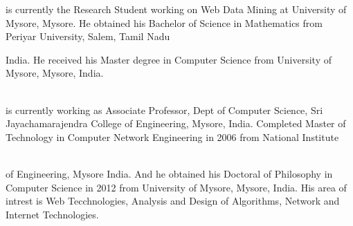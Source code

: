 \documentclass[fleqn,twoside]{article}
\begin{document}
\begin{minipage}[b][1in][c]{1.7in}
{ is currently the Research Student working on Web Data Mining at University of Mysore, Mysore. He obtained his Bachelor of Science in Mathematics from Periyar University, Salem, Tamil Nadu}\\
\end{minipage} India. He received his Master degree in Computer Science from University of Mysore, Mysore, India.  \\\\

\begin{minipage}[b][1in][c]{1.7in}
{  is currently working as Associate Professor, Dept of Computer Science,  Sri Jayachamarajendra College of Engineering, Mysore, India. Completed Master of Technology in Computer Network Engineering in 2006 from National Institute 
}\\\\
\end{minipage}  of Engineering, Mysore India. And he obtained his Doctoral of Philosophy in Computer Science in 2012 from University of Mysore, Mysore, India. His area of intrest is Web Tecchnologies, Analysis and Design of Algorithms, Network and Internet Technologies.  \\\\

\balance
\end{document}
